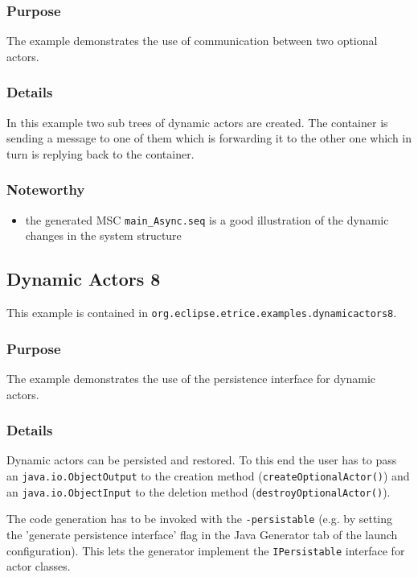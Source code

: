 \subsubsection{Purpose}

The example demonstrates the use of communication between two optional actors.

\subsubsection{Details}

In this example two sub trees of dynamic actors are created. The container is sending a message to one of them which is forwarding
it to the other one which in turn is replying back to the container.

\subsubsection{Noteworthy}

\begin{itemize}
\item the generated MSC \texttt{main\_Async.seq} is a good illustration of the dynamic changes in the system structure
\end{itemize}

\subsection{Dynamic Actors 8}

This example is contained in \texttt{org.eclipse.etrice.examples.dynamicactors8}.

\subsubsection{Purpose}

The example demonstrates the use of the persistence interface for dynamic actors.

\subsubsection{Details}

Dynamic actors can be persisted and restored. To this end the user has to pass an \texttt{java.io.ObjectOutput} to
the creation method (\texttt{createOptionalActor()}) and an \texttt{java.io.ObjectInput} to the deletion method (\texttt{destroyOptionalActor()}).

The code generation has to be invoked with the \texttt{-persistable} (e.g. by setting the 'generate persistence interface' flag in the Java Generator tab
of the launch configuration). This lets the generator implement the \texttt{IPersistable} interface for actor classes.

